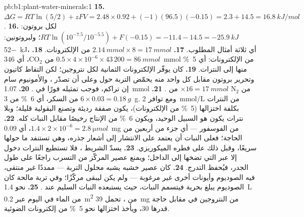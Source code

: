 \begin{solution}{pb:b1:plant-water-minerals:1}
\textbf{15.} $\Delta G = RT\ln(5/2) + zFV = 2.48\times 0.92 + (-1)(96.5)(-0.15)
= 2.3 + 14.5 = \qty{16.8}{kJ/mol}$.
\textbf{16.} لكل بروتون: $RT\ln(10^{-7.5}/10^{-5.5}) + F(-0.15) =
-11.4 - 14.5 = \qty{-25.9}{kJ}$؛ ولبروتونين: \qty{-52}{kJ}، أي ثلاثة
أمثال المطلوب.
\textbf{17.} $\qty{2.14}{mmol}\times 8 = \qty{17}{mmol}$ من الإلكترونات.
\textbf{18.} $0.5\times 4\times 10^{-6}\times 43\,200 = \qty{86}{mmol}$
من $\mathrm{CO_2}$، أي \qty{346}{mmol} من الإلكترونات: أي \qty{5}{\%}
منها إلى النترات.
\textbf{19.} كان يوفّر الإلكترونات الثمانية لكل نتروجين؛ لكن
التقاط كاتيون وتحرير بروتون مقابل كل واحد منه يحمّض التربة حول
 وعلى  أن تصدّر ، والأمونيوم سام إن تراكم، فوجب
تمثيله فورًا في .
\textbf{20.} \qty{1.07}{mmol} من $\mathrm{N_2}$ $\times 16 =
\qty{17}{mmol}$ من .
\textbf{21.} $6\times 0.03 = \qty{0.18}{g}$ من السكر، أي \qty{6}{\%} من
\qty{3}{g}. ومع توافر \qty{2}{mmol/L} من النترات بكلفة اختزالها
(\qty{5}{\%} من الإلكترونات)، يكون  صفقة رديئة وتصنع
البقولية  قليلة؛ وبلا نترات يكون هو السبيل الوحيد، ويكون
\qty{6}{\%} من الإنتاج رخيصًا مقابل  النبات كله.
\textbf{22.} $1.4\times 2\times 10^{-6} = \qty{2.8}{\micro mol}$، أي
\qty{0.09}{mg} من الفوسفور --- أي جزء من أربعين من الحاجة؛ فعلى
النبات أن يعتمد على الانتشار إلى أشعار جذره، وهي تستنفد ما حولها
سريعًا، وقبل ذلك على فطره الميكوريزي.
\textbf{23.} يسدّ الشريط ، فلا تستطيع النترات دخول 
إلا عبر   التي تضخها إلى الداخل؛ ويمنع عصير
 المركّز من التسرب راجعًا على طول الجدر، فيُحفظ التدرج.
\textbf{24.} كان عصير خشبه يشبه محلول التربة --- ممددًا غير منتقى،
فيه الصوديوم وأيونات أخرى غير مرغوبة --- ولم يكن ليبقى مركّزًا؛ وفي
تربة مالحة كان الصوديوم يبلغ  بحرية فيتسمم النبات، حيث
يستبعده النبات السليم عند .
\textbf{25.} نحو \qty{1.4}{L} من الماء في اليوم عبر \qty{0.2}{m^2}
من ، تحمل \qty{39}{mg} من النتروجين في مقابل حاجة قدرها
\qty{30}{}، ويأخذ اختزالها نحو \qty{5}{\%} من إلكترونات 
الضوئية.
\end{solution}
